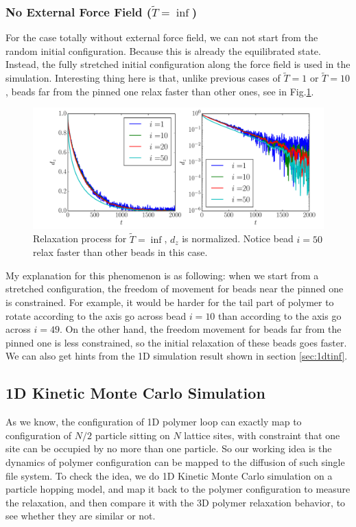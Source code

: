 \documentclass[12pt,a4paper]{article}
\begin{document}
\subsubsection{No External Force Field ($\tilde{T}=\inf$)}
For the case totally without external force field, we can not start from the
random initial configuration. Because this is already the equilibrated state.
Instead, the fully stretched initial configuration along the force field is used
in the simulation. Interesting thing here is that, unlike previous cases of
$\tilde{T}=1$ or $\tilde{T}=10$, beads far from the pinned one relax faster than
other ones, see in Fig.\ref{fig:bdtinf}.

\begin{figure}[htpb]
    \centering
    \includegraphics[width=1.0\linewidth]{fig4report/bd_N100_Tinf.pdf}
    \caption{Relaxation process for $\tilde{T}=\inf$, $d_z$ is normalized.
        Notice bead $i=50$ relax faster than other beads in this case.} 
    \label{fig:bdtinf}
\end{figure}
My explanation for this phenomenon is as following: when we start from a
stretched configuration, the freedom of movement for beads near the pinned one
is constrained. For example, it would be harder for the tail part of polymer to
rotate according to the axis go across bead $i=10$ than according to the axis go
across $i=49$. On the other hand, the freedom movement for beads far from the
pinned one is less constrained, so the initial relaxation of these beads goes
faster. We can also get hints from the 1D simulation result shown in section
\ref{sec:1dtinf}.

\subsection{1D Kinetic Monte Carlo Simulation}
As we know, the configuration of 1D polymer loop can exactly map to
configuration of $N/2$ particle sitting on $N$ lattice sites, with constraint
that one site can be occupied by no more than one particle. So our working idea
is the dynamics of polymer configuration can be mapped to the diffusion of such
single file system. To check the idea, we do 1D Kinetic Monte Carlo simulation
on a particle hopping model, and map it back to the polymer configuration to
measure the relaxation, and then compare it with the 3D polymer relaxation
behavior, to see whether they are similar or not.  
\end{document}
